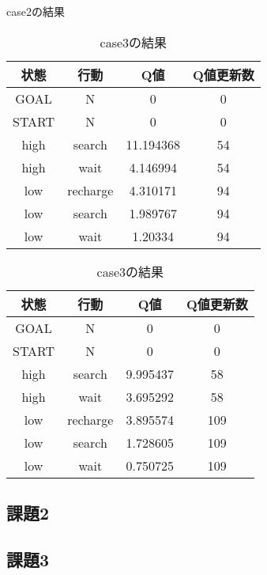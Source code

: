 \begin{enumerate}
\begin{table}
    \begin{minipage}[t]{0.45\hsize}
      \centering
      \caption{case2の結果}
      \label{table:4}
      \begin{tabular}{|c|c|c|c|}
        \hline
        状態 & 行動 & Q値 & Q値更新数\\
        \hline
        GOAL & N & 0 & 0 \\
        START & N & 0 & 0 \\
        high & search & 11.194368 & 54 \\
        high & wait & 4.146994 & 54 \\
        low & recharge & 4.310171 & 94 \\
        low & search & 1.989767 & 94 \\
        low & wait & 1.20334 & 94 \\
        \hline
      \end{tabular}
    \end{minipage}
    \begin{minipage}[t]{0.45\hsize}
      \centering
      \caption{case3の結果}
      \label{table:5}
        \begin{tabular}{|c|c|c|c|}
          \hline
          状態 & 行動 & Q値 & Q値更新数\\
          \hline
          GOAL & N & 0 & 0 \\
          START & N & 0 & 0 \\
          high & search & 9.995437 & 58 \\
          high & wait & 3.695292 & 58 \\
          low & recharge & 3.895574 & 109 \\
          low & search & 1.728605 & 109 \\
          low & wait & 0.750725 & 109 \\
          \hline
        \end{tabular}
      \end{minipage}
  \end{table}

\end{enumerate}



\subsection{課題2}

\subsection{課題3}




